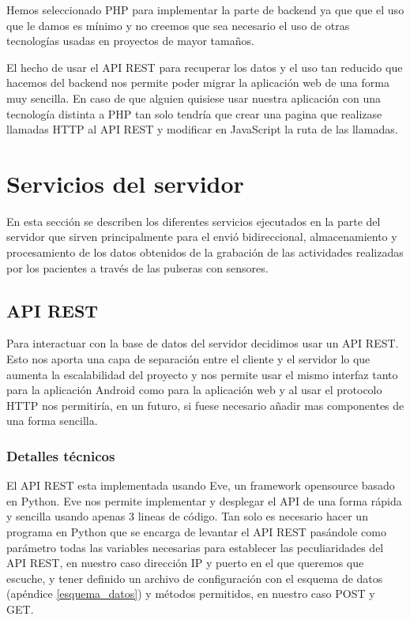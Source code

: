 Hemos seleccionado PHP para implementar la parte de backend ya que que el uso que le damos es mínimo y no creemos que sea necesario el uso de otras tecnologías usadas en proyectos de mayor tamaños.
\newline

El hecho de usar el API REST para recuperar los datos y el uso tan reducido que hacemos del backend nos permite poder migrar la aplicación web de una forma muy sencilla. En caso de que alguien quisiese usar nuestra aplicación con una tecnología distinta a PHP tan solo tendría que crear una pagina que realizase llamadas HTTP al API REST y modificar en JavaScript la ruta de las llamadas.
\newpage


\section{Servicios del servidor}
En esta sección se describen los diferentes servicios ejecutados en la parte del servidor que sirven principalmente para el envió bidireccional, almacenamiento y procesamiento de los datos obtenidos de la grabación de las actividades realizadas por los pacientes a través de las pulseras con sensores.

\subsection{API REST}
Para interactuar con la base de datos del servidor decidimos usar un API REST. Esto nos aporta una capa de separación entre el cliente y el servidor lo que aumenta la escalabilidad del proyecto y nos permite usar el mismo interfaz tanto para la aplicación Android como para la aplicación web y al usar el protocolo HTTP nos permitiría, en un futuro, si fuese necesario añadir mas componentes de una forma sencilla.

\subsubsection{Detalles técnicos}
El API REST esta implementada usando Eve, un framework opensource basado en Python. Eve nos permite implementar y desplegar el API de una forma rápida y sencilla usando apenas 3 lineas de código. Tan solo es necesario hacer un programa en Python que se encarga de levantar el API REST pasándole como parámetro todas las variables necesarias para establecer las peculiaridades del API REST, en nuestro caso dirección IP y puerto en el que queremos que escuche, y tener definido un archivo de configuración con el esquema de datos (apéndice \ref{esquema_datos}) y métodos permitidos, en nuestro caso POST y GET.

